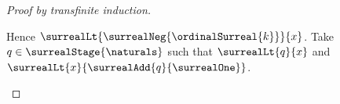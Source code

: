 \begin{proof}[Proof by transfinite induction]
\begin{byCase}
\begin{byCase}
\begin{byCase}
\begin{byCase}
\begin{byCase}
                                            Hence
                                                $\surrealLt
                                                    {\surrealNeg{\ordinalSurreal{k}}}{x}$.
                                            Take $q\in
                                                \surrealStage{\naturals}$ such that
                                                $\surrealLt{q}{x}$ and
                                                $\surrealLt{x}
                                                    {\surrealAdd{q}{\surrealOne}}$.
                                    \end{byCase}
                            \end{byCase}
                    \end{byCase}
            \end{byCase}
    \end{byCase}
\end{proof}

